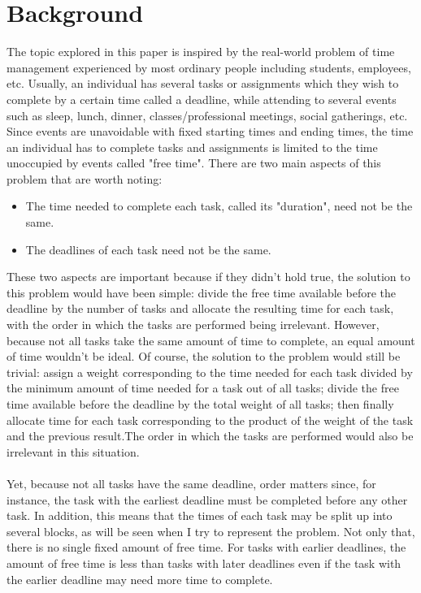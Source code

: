 \documentclass[11pt]{article}
\begin{document}
\section{Background}
The topic explored in this paper is inspired by the real-world problem of time management experienced by most ordinary people including students, employees, etc. Usually, an individual has several tasks or assignments which they wish to complete by a certain time called a deadline, while attending to several events such as sleep, lunch, dinner, classes/professional meetings, social gatherings, etc. Since events are unavoidable with fixed starting times and ending times, the time an individual has to complete tasks and assignments is limited to the time unoccupied by events called "free time". There are two main aspects of this problem that are worth noting:
\begin{itemize}
\item The time needed to complete each task, called its "duration", need not be the same.
\item The deadlines of each task need not be the same.
\end{itemize}
These two aspects are important because if they didn't hold true, the solution to this problem would have been simple: divide the free time available before the deadline by the number of tasks and allocate the resulting time for each task, with the order in which the tasks are performed being irrelevant. However, because not all tasks take the same amount of time to complete, an equal amount of time wouldn't be ideal. Of course, the solution to the problem would still be trivial: assign a weight corresponding to the time needed for each task divided by the minimum amount of time needed for a task out of all tasks; divide the free time available before the deadline by the total weight of all tasks; then finally allocate time for each task corresponding to the product of the weight of the task and the previous result.The order in which the tasks are performed would also be irrelevant in this situation.  \\ \\ 
Yet, because not all tasks have the same deadline, order matters since, for instance, the task with the earliest deadline must be completed before any other task. In addition, this means that the times of each task may be split up into several blocks, as will be seen when I try to represent the problem. Not only that, there is no single fixed amount of free time. For tasks with earlier deadlines, the amount of free time is less than tasks with later deadlines even if the task with the earlier deadline may need more time to complete.\\ \\
\end{document}
